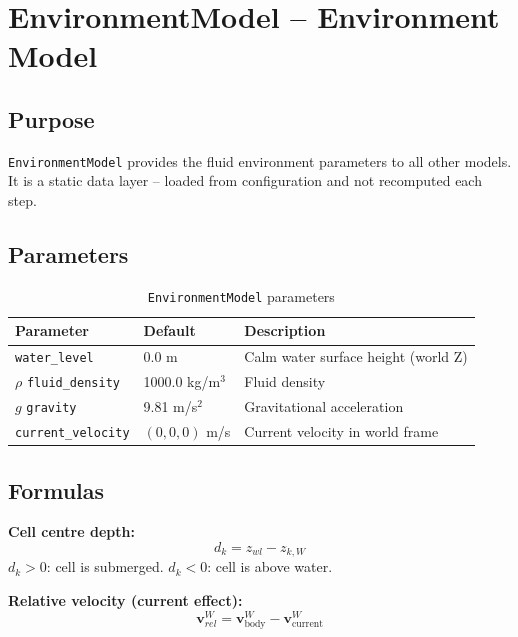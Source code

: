 \documentclass[12pt,a4paper]{article}
\begin{document}
\newpage
\section{EnvironmentModel -- Environment Model}

\subsection{Purpose}

\texttt{EnvironmentModel} provides the fluid environment parameters
to all other models. It is a static data layer -- loaded from configuration
and not recomputed each step.

\subsection{Parameters}

\begin{table}[H]
  \centering
  \caption{\texttt{EnvironmentModel} parameters}
  \begin{tabularx}{\linewidth}{llX}
    \toprule
    \textbf{Parameter} & \textbf{Default} & \textbf{Description} \\
    \midrule
    \texttt{water\_level} & 0.0 m & Calm water surface height (world Z) \\
    $\rho$ \texttt{fluid\_density} & 1000.0 kg/m$^3$ & Fluid density \\
    $g$ \texttt{gravity} & 9.81 m/s$^2$ & Gravitational acceleration \\
    \texttt{current\_velocity} & $(0,0,0)$ m/s & Current velocity in world frame \\
    \bottomrule
  \end{tabularx}
\end{table}

\subsection{Formulas}

\textbf{Cell centre depth:}
\begin{equation}
  d_k = z_{wl} - z_{k,W}
  \label{eq:depth}
\end{equation}
$d_k > 0$: cell is submerged. $d_k < 0$: cell is above water.

\textbf{Relative velocity (current effect):}
\begin{equation}
  \mathbf{v}_{rel}^W = \mathbf{v}_{\text{body}}^W - \mathbf{v}_{\text{current}}^W
  \label{eq:rel_vel}
\end{equation}
\end{document}
